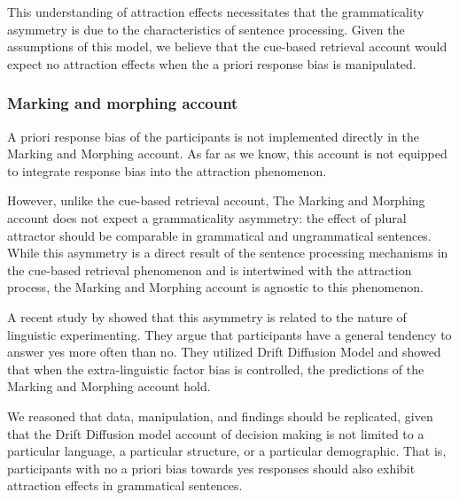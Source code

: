 This understanding of attraction effects necessitates that the grammaticality asymmetry is due to the characteristics of sentence processing. Given the assumptions of this model, we believe that the cue-based retrieval account would expect no attraction effects when the a priori response bias is manipulated. 

\subsubsection{Marking and morphing account}

A priori response bias of the participants is not implemented directly in the Marking and Morphing account. As far as we know, this account is not equipped to integrate response bias into the attraction phenomenon. 

However, unlike the cue-based retrieval account, The Marking and Morphing account does not expect a grammaticality asymmetry: the effect of plural attractor should be comparable in grammatical and ungrammatical sentences. While this asymmetry is a direct result of the sentence processing mechanisms in the cue-based retrieval phenomenon and is intertwined with the attraction process, the Marking and Morphing account is agnostic to this phenomenon.  

A recent study by  showed that this asymmetry is related to the nature of linguistic experimenting. They argue that participants have a general tendency to answer yes more often than no. They utilized \cites{Ratcliff1978} Drift Diffusion Model and showed that when the extra-linguistic factor bias is controlled, the predictions of the Marking and Morphing account hold.

We reasoned that \cites{HammerlyEtAl2019} data, manipulation, and findings should be replicated, given that the Drift Diffusion model account of decision making is not limited to a particular language, a particular structure, or a particular demographic. That is, participants with no a priori bias towards yes responses should also exhibit attraction effects in grammatical sentences.



